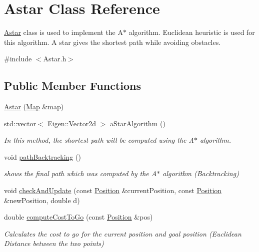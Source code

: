 \hypertarget{classAstar}{}\section{Astar Class Reference}
\label{classAstar}


\hyperlink{classAstar}{Astar} class is used to implement the A$\ast$ algorithm. Euclidean heuristic is used for this algorithm. A star gives the shortest path while avoiding obstacles.  




{\ttfamily \#include $<$Astar.\+h$>$}

\subsection*{Public Member Functions}
\begin{DoxyCompactItemize}
\item 
\hyperlink{classAstar_a9f5d925a6e411e851234ab4ef311e7f7}{Astar} (\hyperlink{classMap}{Map} \&map)
\item 
std\+::vector$<$ Eigen\+::\+Vector2d $>$ \hyperlink{classAstar_a4addd7a1866da125d6bb035e52f08627}{a\+Star\+Algorithm} ()
\begin{DoxyCompactList}\small\item\em In this method, the shortest path will be computed using the A$\ast$ algorithm. \end{DoxyCompactList}\item 
void \hyperlink{classAstar_a71dab0041f5937321717a503d3aa1827}{path\+Backtracking} ()
\begin{DoxyCompactList}\small\item\em shows the final path which was computed by the A$\ast$ algorithm (Backtracking) \end{DoxyCompactList}\item 
void \hyperlink{classAstar_a47ad9c479ad2a824d5902bd76d8fd88a}{check\+And\+Update} (const \hyperlink{structPosition}{Position} \&current\+Position, const \hyperlink{structPosition}{Position} \&new\+Position, double d)
\item 
double \hyperlink{classAstar_a489c224e6100635858f738a64d408e0e}{compute\+Cost\+To\+Go} (const \hyperlink{structPosition}{Position} \&pos)
\begin{DoxyCompactList}\small\item\em Calculates the cost to go for the current position and goal position (Euclidean Distance between the two points) \end{DoxyCompactList}\item 

\end{DoxyCompactItemize}
